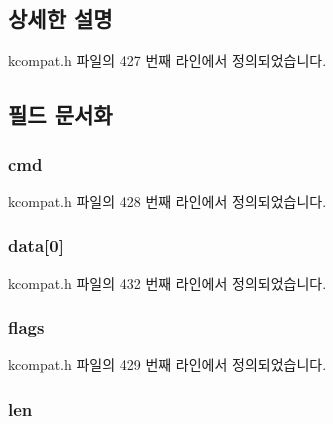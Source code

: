 \subsection{상세한 설명}


kcompat.\+h 파일의 427 번째 라인에서 정의되었습니다.



\subsection{필드 문서화}
\subsubsection[{\texorpdfstring{cmd}{cmd}}]{ cmd}\hypertarget{structethtool__test_a62fe2a1dbf17d5a8561a5a7f5a97a9ba}{}\label{structethtool__test_a62fe2a1dbf17d5a8561a5a7f5a97a9ba}


kcompat.\+h 파일의 428 번째 라인에서 정의되었습니다.

\subsubsection[{\texorpdfstring{data}{data}}]{ data\mbox{[}0\mbox{]}}\hypertarget{structethtool__test_ae94c28f3505a41fa45aad7ce037322f5}{}\label{structethtool__test_ae94c28f3505a41fa45aad7ce037322f5}


kcompat.\+h 파일의 432 번째 라인에서 정의되었습니다.

\subsubsection[{\texorpdfstring{flags}{flags}}]{ flags}\hypertarget{structethtool__test_a9fb2abd9f2594cefc48d6856e01f2879}{}\label{structethtool__test_a9fb2abd9f2594cefc48d6856e01f2879}


kcompat.\+h 파일의 429 번째 라인에서 정의되었습니다.

\subsubsection[{\texorpdfstring{len}{len}}]{ len}\hypertarget{structethtool__test_a4105737bcbe35c1fd69996a085d8231a}{}\label{structethtool__test_a4105737bcbe35c1fd69996a085d8231a}


